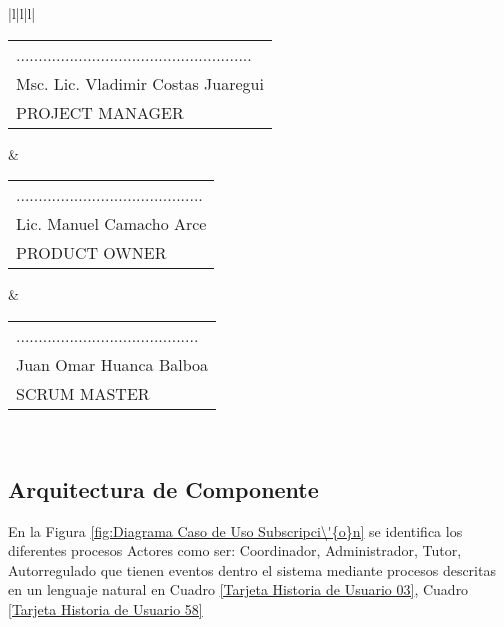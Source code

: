 \begin{minipage}[b]{\hsize}
\begin{tabular}{|l|l|l|}
 \\ \hline
\begin{tabular}[c]{@{}l@{}}.....................................................\\ Msc. Lic. Vladimir Costas Juaregui\\ PROJECT MANAGER\end{tabular} & \begin{tabular}[c]{@{}l@{}}..........................................\\ Lic. Manuel Camacho Arce\\ PRODUCT OWNER\end{tabular} & \begin{tabular}[c]{@{}l@{}}.........................................\\ Juan Omar Huanca Balboa\\ SCRUM MASTER\end{tabular} \\ \hline
\end{tabular}
\label{Tarjeta Historia de Usuario 58}
\end{minipage}

\subsection{Arquitectura de Componente}

En la Figura \ref{fig:Diagrama Caso de Uso Subscripci\'{o}n} se identifica los 
diferentes procesos Actores como ser: Coordinador, Administrador, Tutor, 
Autorregulado que tienen eventos dentro el sistema mediante procesos descritas
en un lenguaje natural en Cuadro \ref{Tarjeta Historia de Usuario 03}, Cuadro
\ref{Tarjeta Historia de Usuario 58}

\begin{minipage}{1.0\textwidth}
	\centering
	\label{fig:Diagrama Caso de Uso Subscripci\'{o}n}
\end{minipage}

